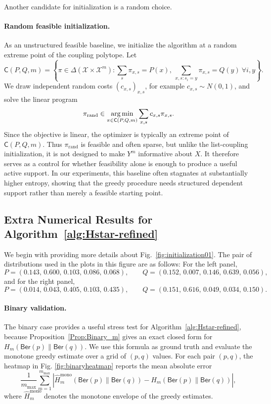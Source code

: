 \documentclass[journal]{IEEEtran}
\def\argmin{\mathop{\rm arg\, min}}
\def\argmin{\mathop{\rm arg\, min}}
\newcommand{\1}{\mathbf{1}}
\newcommand{\Ber}{\mathsf{Ber}}
\begin{document}
Another candidate for initialization is a random choice. 

\paragraph{Random feasible initialization.}
As an unstructured feasible baseline, we initialize the algorithm at a random
extreme point of the coupling polytope. Let
\[
\mathsf C(P,Q,m)
=
\left\{
\pi\in\Delta(\mathcal X\times\mathcal X^m):
\sum_s\pi_{x,s}=P(x),\ 
\sum_{x,s:s_i=y}\pi_{x,s}=Q(y)\ \forall i,y
\right\}.
\]
We draw independent random costs \((c_{x,s})_{x,s}\), for example
\(c_{x,s}\sim N(0,1)\), and solve the linear program
\[
\pi_{\mathrm{rand}}
\in
\argmin_{\pi\in\mathsf C(P,Q,m)}
\sum_{x,s} c_{x,s}\pi_{x,s}.
\]
Since the objective is linear, the optimizer is typically an extreme point of
\(\mathsf C(P,Q,m)\). Thus \(\pi_{\mathrm{rand}}\) is feasible and often sparse,
but unlike the list-coupling initialization, it is not designed to make
\(Y^m\) informative about \(X\). It therefore serves as a control for whether
feasibility alone is enough to produce a useful active support. In our
experiments, this baseline often stagnates at substantially higher entropy,
showing that the greedy procedure needs structured dependent support rather
than merely a feasible starting point.

\subsection{Extra Numerical Results for Algorithm~\ref{alg:Hstar-refined}}\label{app:extranumerical}
We begin with providing more details about Fig.~\ref{fig:initialization01}. The pair of distributions used in the plots in this figure are as follows: For the left panel,
\[P=(0.143,\,0.600,\,0.103,\,0.086,\,0.068),
\qquad Q=(0.152,\,0.007,\,0.146,\,0.639,\,0.056),\]
and for the right panel,
\[P=(0.014,\,0.043,\,0.405,\,0.103,\,0.435),
\qquad Q=(0.151,\,0.616,\,0.049,\,0.034,\,0.150).\]



\paragraph{Binary validation.}
The binary case provides a useful stress test for
Algorithm~\ref{alg:Hstar-refined}, because Proposition~\ref{Prop:Binary_m}
gives an exact closed form for \(H_m(\Ber(p)\|\Ber(q))\). We use this formula
as ground truth and evaluate the monotone greedy estimate over a grid of
\((p,q)\) values. For each pair \((p,q)\), the heatmap in Fig. \ref{fig:binaryheatmap} reports the mean
absolute error
\[
\frac{1}{m_{\max}}\sum_{m=1}^{m_{\max}}
\left|
\widehat H_m^{\mathrm{mono}}(\Ber(p)\|\Ber(q))
-
H_m(\Ber(p)\|\Ber(q))
\right|,
\]
where \(\widehat H_m^{\mathrm{mono}}\) denotes the monotone envelope of the
greedy estimates. 
\end{document}
